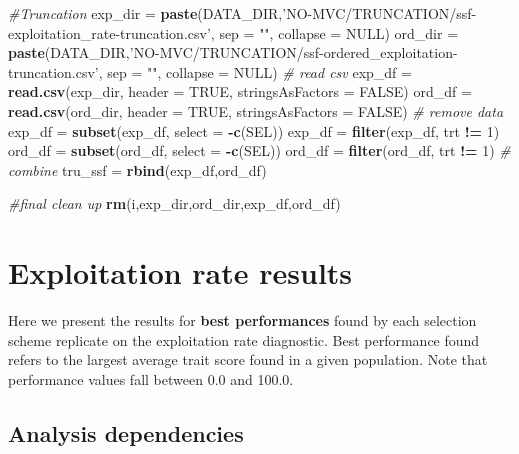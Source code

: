 \documentclass[]{book}
\newenvironment{Shaded}{\begin{snugshade}}{\end{snugshade}}
\newcommand{\CommentTok}[1]{\textcolor[rgb]{0.56,0.35,0.01}{\textit{#1}}}
\newcommand{\DataTypeTok}[1]{\textcolor[rgb]{0.13,0.29,0.53}{#1}}
\newcommand{\DecValTok}[1]{\textcolor[rgb]{0.00,0.00,0.81}{#1}}
\newcommand{\KeywordTok}[1]{\textcolor[rgb]{0.13,0.29,0.53}{\textbf{#1}}}
\newcommand{\NormalTok}[1]{#1}
\newcommand{\OperatorTok}[1]{\textcolor[rgb]{0.81,0.36,0.00}{\textbf{#1}}}
\newcommand{\OtherTok}[1]{\textcolor[rgb]{0.56,0.35,0.01}{#1}}
\newcommand{\StringTok}[1]{\textcolor[rgb]{0.31,0.60,0.02}{#1}}
\begin{document}
\begin{Shaded}
\begin{Highlighting}[]
\CommentTok{#Truncation}
\NormalTok{exp_dir =}\StringTok{ }\KeywordTok{paste}\NormalTok{(DATA_DIR,}\StringTok{'NO-MVC/TRUNCATION/ssf-exploitation_rate-truncation.csv'}\NormalTok{, }\DataTypeTok{sep =} \StringTok{""}\NormalTok{, }\DataTypeTok{collapse =} \OtherTok{NULL}\NormalTok{)}
\NormalTok{ord_dir =}\StringTok{ }\KeywordTok{paste}\NormalTok{(DATA_DIR,}\StringTok{'NO-MVC/TRUNCATION/ssf-ordered_exploitation-truncation.csv'}\NormalTok{, }\DataTypeTok{sep =} \StringTok{""}\NormalTok{, }\DataTypeTok{collapse =} \OtherTok{NULL}\NormalTok{)}
\CommentTok{# read csv}
\NormalTok{exp_df =}\StringTok{ }\KeywordTok{read.csv}\NormalTok{(exp_dir, }\DataTypeTok{header =} \OtherTok{TRUE}\NormalTok{, }\DataTypeTok{stringsAsFactors =} \OtherTok{FALSE}\NormalTok{)}
\NormalTok{ord_df =}\StringTok{ }\KeywordTok{read.csv}\NormalTok{(ord_dir, }\DataTypeTok{header =} \OtherTok{TRUE}\NormalTok{, }\DataTypeTok{stringsAsFactors =} \OtherTok{FALSE}\NormalTok{)}
\CommentTok{# remove data}
\NormalTok{exp_df =}\StringTok{ }\KeywordTok{subset}\NormalTok{(exp_df, }\DataTypeTok{select =} \OperatorTok{-}\KeywordTok{c}\NormalTok{(SEL))}
\NormalTok{exp_df =}\StringTok{ }\KeywordTok{filter}\NormalTok{(exp_df, trt }\OperatorTok{!=}\StringTok{ }\DecValTok{1}\NormalTok{)}
\NormalTok{ord_df =}\StringTok{ }\KeywordTok{subset}\NormalTok{(ord_df, }\DataTypeTok{select =} \OperatorTok{-}\KeywordTok{c}\NormalTok{(SEL))}
\NormalTok{ord_df =}\StringTok{ }\KeywordTok{filter}\NormalTok{(ord_df, trt }\OperatorTok{!=}\StringTok{ }\DecValTok{1}\NormalTok{)}
\CommentTok{# combine}
\NormalTok{tru_ssf =}\StringTok{ }\KeywordTok{rbind}\NormalTok{(exp_df,ord_df)}

\CommentTok{#final clean up}
\KeywordTok{rm}\NormalTok{(i,exp_dir,ord_dir,exp_df,ord_df)}
\end{Highlighting}
\end{Shaded}

\hypertarget{exploitation-rate-results}{%
\chapter{Exploitation rate results}\label{exploitation-rate-results}}

Here we present the results for \textbf{best performances} found by each selection scheme replicate on the exploitation rate diagnostic.
Best performance found refers to the largest average trait score found in a given population.
Note that performance values fall between 0.0 and 100.0.

\hypertarget{analysis-dependencies}{%
\section{Analysis dependencies}\label{analysis-dependencies}}
\end{document}

